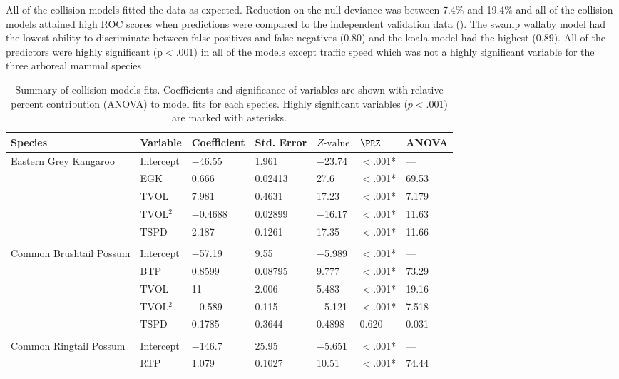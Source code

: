 All of the collision models fitted the data as expected.  Reduction on the null deviance was between 7.4\% and 19.4\% and all of the collision models attained high ROC scores when predictions were compared to the independent validation data ().  The swamp wallaby model had the lowest ability to discriminate between false positives and false negatives (0.80) and the koala model had the highest (0.89). All of the predictors were highly significant (p$<$.001) in all of the models except traffic speed which was not a highly significant variable for the three arboreal mammal species

\begin{table}[!t]
\caption[Summary of collision models for six mammal species]{Summary of collision models fits. Coefficients and significance of variables are shown with relative percent contribution (ANOVA) to model fits for each species.  Highly significant variables ($p<$.001) are marked with asterisks.}
\centering
\begin{tabularx}{0.9\textwidth}{lllllll} \toprule
Species & Variable & Coefficient & Std. Error & $Z\text{-value}$ & $\PRZ$ & ANOVA \\ 
\midrule
Eastern Grey Kangaroo & Intercept & $-$46.55 & 1.961 & $-$23.74 & $<$.001* & --- \\ 
   & EGK & 0.666 & 0.02413 & 27.6 & $<$.001* & 69.53 \\ 
   & TVOL & 7.981 & 0.4631 & 17.23 & $<$.001* & 7.179 \\ 
   & TVOL$^2$ & $-$0.4688 & 0.02899 & $-$16.17 & $<$.001* & 11.63 \\ 
   & TSPD & 2.187 & 0.1261 & 17.35 & $<$.001* & 11.66 \\ 
   &  &  &  &  &  &  \\ 
Common Brushtail Possum & Intercept & $-$57.19 & 9.55 & $-$5.989 & $<$.001* & --- \\ 
   & BTP & 0.8599 & 0.08795 & 9.777 & $<$.001* & 73.29 \\ 
   & TVOL & 11 & 2.006 & 5.483 & $<$.001* & 19.16 \\ 
   & TVOL$^2$ & $-$0.589 & 0.115 & $-$5.121 & $<$.001* & 7.518 \\ 
   & TSPD & 0.1785 & 0.3644 & 0.4898 & 0.620 & 0.031 \\ 
   &  &  &  &  &  &  \\ 
Common Ringtail Possum & Intercept & $-$146.7 & 25.95 & $-$5.651 & $<$.001* & --- \\ 
   & RTP & 1.079 & 0.1027 & 10.51 & $<$.001* & 74.44 \\ 

\end{tabularx}
\end{table}
